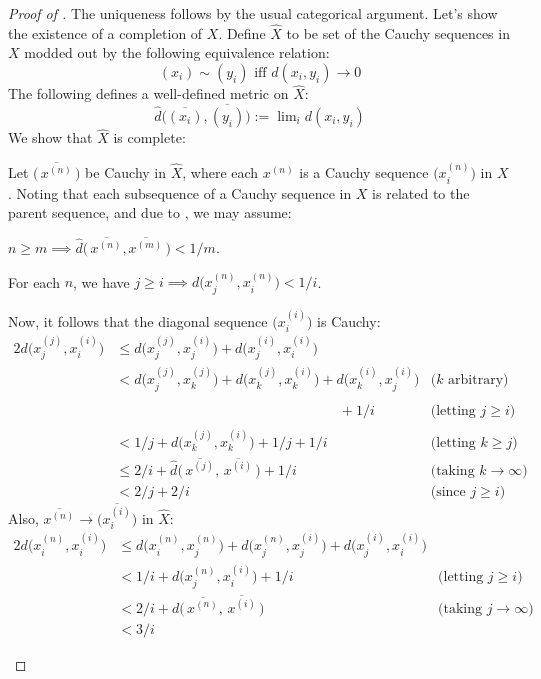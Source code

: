 	\begin{proof}[Proof of ]
		The uniqueness follows by the usual categorical argument. Let's show the existence of a completion of $X$. Define $\hat X$ to be set of the Cauchy sequences in $X$ modded out by the following equivalence relation:
		\[
		(x_i)\sim (y_i) \text{ iff } d(x_i, y_i)\to 0
		\]
		The following defines a well-defined metric on $\hat X$:
		\[
		\hat d\bigl( \overline{(x_i)}, \overline{(y_i)} \bigr) := \lim\nolimits_i d(x_i, y_i)
		\]
		We show that $\hat X$ is complete:
		\begin{subproof}
			Let $\bigl(\,\overline{x^{(n)}}\,\bigr)$ be Cauchy in $\hat X$, where each $x^{(n)}$ is a Cauchy sequence $\bigl(x^{(n)}_i\bigr)$ in $X$. Noting that each subsequence of a Cauchy sequence in $X$ is related to the parent sequence, and due to , we may \wlogg assume:
			\begin{mylist}
				\item $n \ge m\implies \hat d\bigl(\, \overline{x^{(n)}}, \overline{x^{(m)}}\, \bigr) < 1/m$.
				
				\item For each $n$, we have $j\ge i\implies d\bigl(x^{(n)}_j, x^{(n)}_i\bigr) < 1/i$.
			\end{mylist}
			Now, it follows that the diagonal sequence $\bigl(x^{(i)}_i\bigr)$ is Cauchy:
			\begin{alignat*}{2}
				d\bigl(x^{(j)}_j, x^{(i)}_i\bigr)
				& \le d\bigl(x^{(j)}_j, x^{(i)}_j\bigr) + d\bigl(x^{(i)}_j, x^{(i)}_i\bigr)\\
				& < d\bigl(x^{(j)}_j, x^{(j)}_k\bigr) + d\bigl(x^{(j)}_k, x^{(i)}_k\bigr) + d\bigl(x^{(i)}_k, x^{(i)}_j\bigr) & \text{($k$ arbitrary)}\\
				& \phantom{{} < d\bigl(x^{(j)}_j, x^{(j)}_k\bigr) + d\bigl(x^{(j)}_k, x^{(i)}_k\bigr) abc} {}+ 1/i & \text{(letting $j\ge i$)}\\
				& < 1/j + d\bigl(x^{(j)}_k, x^{(i)}_k\bigr) + 1/j +1/i & \text{(letting $k\ge j$)}\\
				& \le 2/i + \hat d\bigl(\, \overline{x^{(j)}},\, \overline{x^{(i)}}\, \bigr) + 1/i & \text{(taking $k\to \infty$)}\\
				& < 2/j + 2/i & \text{(since $j\ge i$)}
 			\end{alignat*}
			Also, $\overline{x^{(n)}}\to \overline{\bigl(x^{(i)}_i\bigr)}$ in $\hat X$:
			\begin{alignat*}{2}
				d\bigl( x^{(n)}_i, x^{(i)}_i \bigr)
				& \le d\bigl( x^{(n)}_i, x^{(n)}_j \bigr) + d\bigl( x^{(n)}_j, x^{(i)}_j \bigr) + d\bigl( x^{(i)}_j, x^{(i)}_i \bigr)\\
				& < 1/i + d\bigl( x^{(n)}_j, x^{(i)}_i \bigr) + 1/i & \text{(letting $j\ge i$)}\\
				& < 2/i + d\bigl(\, \overline{x^{(n)}},\,\overline{x^{(i)}} \,\bigr) & \text{(taking $j\to\infty$)}\\
				& < 3/i
			\end{alignat*}
		\end{subproof}


\end{proof}
